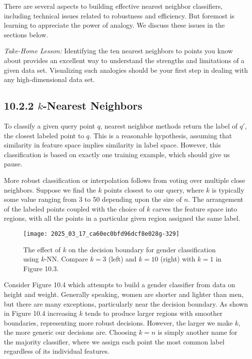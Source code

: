 \documentclass[10pt]{article}
\begin{document}
There are several aspects to building effective nearest neighbor classifiers, including technical issues related to robustness and efficiency. But foremost is learning to appreciate the power of analogy. We discuss these issues in the sections below.

\textit{Take-Home Lesson:} Identifying the ten nearest neighbors to points you know about provides an excellent way to understand the strengths and limitations of a given data set. Visualizing such analogies should be your first step in dealing with any high-dimensional data set.

\subsection*{10.2.2 $k$-Nearest Neighbors}
To classify a given query point $q$, nearest neighbor methods return the label of $q'$, the closest labeled point to $q$. This is a reasonable hypothesis, assuming that similarity in feature space implies similarity in label space. However, this classification is based on exactly one training example, which should give us pause.

More robust classification or interpolation follows from voting over multiple close neighbors. Suppose we find the $k$ points closest to our query, where $k$ is typically some value ranging from 3 to 50 depending upon the size of $n$. The arrangement of the labeled points coupled with the choice of $k$ carves the feature space into regions, with all the points in a particular given region assigned the same label.

\begin{figure}[ht]
    \centering
    \texttt{[image: 2025\_03\_17\_ca60ec0bfd96dcf8e028g-329]}
    \caption{The effect of $k$ on the decision boundary for gender classification using $k$-NN. Compare $k=3$ (left) and $k=10$ (right) with $k=1$ in Figure 10.3.}
\end{figure}

Consider Figure 10.4 which attempts to build a gender classifier from data on height and weight. Generally speaking, women are shorter and lighter than men, but there are many exceptions, particularly near the decision boundary. As shown in Figure 10.4 increasing $k$ tends to produce larger regions with smoother boundaries, representing more robust decisions. However, the larger we make $k$, the more generic our decisions are. Choosing $k=n$ is simply another name for the majority classifier, where we assign each point the most common label regardless of its individual features.
\end{document}
